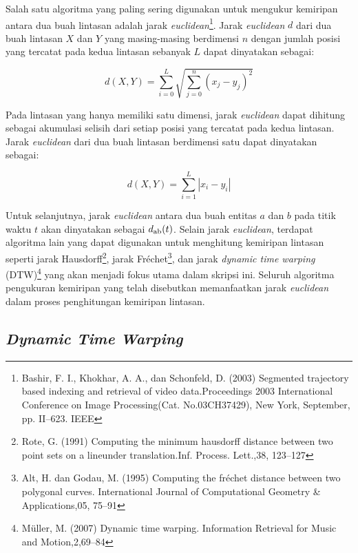 \documentclass[a4paper,twoside]{article}
\begin{document}
Salah satu algoritma yang paling sering digunakan untuk mengukur kemiripan antara dua buah lintasan adalah jarak \textit{euclidean}\footnote{Bashir, F. I., Khokhar, A. A., dan Schonfeld, D. (2003) Segmented trajectory based indexing and retrieval of video data.Proceedings 2003 International Conference on Image Processing(Cat. No.03CH37429), New York, September, pp. II–623. IEEE}. Jarak \textit{euclidean} $d$ dari dua buah lintasan $X$ dan $Y$ yang masing-masing berdimensi $n$ dengan jumlah posisi yang tercatat pada kedua lintasan sebanyak $L$ dapat dinyatakan sebagai:

\begin{equation}
    d(X, Y) = \sum_{i=0}^{L} \sqrt{\sum_{j=0}^{n}(x_j - y_j)^2}
    \label{bab2:euclidean-distance}
\end{equation}

Pada lintasan yang hanya memiliki satu dimensi, jarak \textit{euclidean} dapat dihitung sebagai akumulasi selisih dari setiap posisi yang tercatat pada kedua lintasan. Jarak \textit{euclidean} dari dua buah lintasan berdimensi satu dapat dinyatakan sebagai:

\begin{equation}
    d(X, Y) = \sum_{i = 1}^{L} |x_i - y_i|
\end{equation}

Untuk selanjutnya, jarak \textit{euclidean} antara dua buah entitas $a$ dan $b$ pada titik waktu $t$ akan dinyatakan sebagai $d\textsubscript{ab}(t)$. Selain jarak \textit{euclidean}, terdapat algoritma lain yang dapat digunakan untuk menghitung kemiripan lintasan seperti jarak Hausdorff\footnote{Rote, G. (1991) Computing the minimum hausdorff distance between two point sets on a lineunder translation.Inf. Process. Lett.,38, 123–127}, jarak Fr\'{e}chet\footnote{Alt, H. dan Godau, M. (1995) Computing the fr\'{e}chet distance between two polygonal curves. International Journal of Computational Geometry \& Applications,05, 75–91}, dan jarak \textit{dynamic time warping} (DTW)\footnote{M\"{u}ller, M. (2007) Dynamic time warping. Information Retrieval for Music and Motion,2,69–84} yang akan menjadi fokus utama dalam skripsi ini. Seluruh algoritma pengukuran kemiripan yang telah disebutkan memanfaatkan jarak \textit{euclidean} dalam proses penghitungan kemiripan lintasan.

\subsection{\textit{Dynamic Time Warping}}
\end{document}
